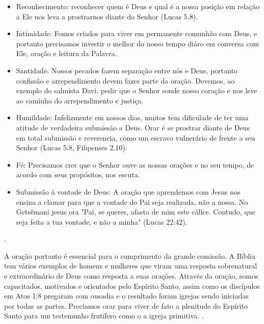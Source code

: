 \documentclass[
	12pt,				%
	openright,			%
	twoside,			%
	a4paper,			%
	english,			%
	french,				%
	spanish,			%
	brazil				%
	]{abntex2}
\begin{document}
\begin{itemize}
	\item Reconhecimento: reconhecer quem é Deus e qual é a nossa posição em relação a Ele nos leva a prostrarnos diante do Senhor (Lucas 5.8).
	\item Intimidade: Fomos criados para viver em permanente comunhão com Deus, e portanto precisamos investir o melhor do nosso tempo diáro em conversa com Ele, oração e leitura da Palavra.
	\item Santidade: Nossos pecados fazem separação entre nós e Deus, portanto confissão e arrependimento devem fazer parte da oração. Devemos, ao exemplo do salmista Davi, pedir que o Senhor sonde nosso coração e nos leve ao caminho do arrependimento e justiça.
	\item Humildade: Infelizmente em nossos dias, muitos tem dificulade de ter uma atitude de verdadeira submissão a Deus. Orar é se prostrar diante de Deus em total submissão e reverencia, como um escravo vulnerário de frente a seu Senhor (Lucas 5.8, Filipenses 2.10).
	\item Fé: Precisamos crer que o Senhor ouve as nossas orações e no seu tempo, de acordo com seus propósitos, nos escuta.
	\item Submissão à vontade de Deus: A oração que aprendemos com Jesus nos ensina a clamar para que a vontade do Pai seja realizada, não a nossa. No Getsêmani jesus ora "Pai, se queres, afasta de mim este cálice. Contudo, que seja feita a tua vontade, e não a minha" (Lucas 22:42).
  \end{itemize}\cite[30,31]{brandao}.

  A oração portanto é essencial para o cumprimento da grande comissão. A Bíblia tem vários exemplos de homens e mulheres que viram uma resposta sobrenatural e extraordinário de Deus como resposta a suas orações. Através da oração, somos capacitados, motivados e orientados pelo Espírito Santo, assim como os discípulos em Atos 1:8 pregaram com ousadia e o resultado foram igrejas sendo iniciadas por todas as partes. Preciamos orar para viver de fato a plenitude do Espírito Santo para um testemunho frutífero como o a igreja primitiva. \cite[32]{brandao}.
\end{document}
